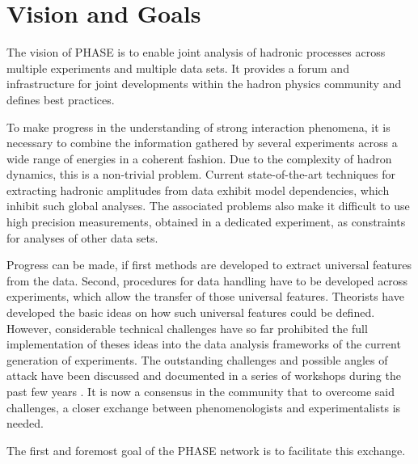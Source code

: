 \section{Vision and Goals}

The vision of PHASE is to enable joint analysis of hadronic processes across multiple experiments and multiple data sets. It provides a forum and infrastructure for joint developments within the hadron physics community and defines best practices.

To make progress in the understanding of strong interaction phenomena, it is necessary to combine the information gathered by several experiments across a wide range of energies in a coherent fashion. Due to the complexity of hadron dynamics, this is a non-trivial problem. Current state-of-the-art techniques for extracting hadronic amplitudes from data exhibit model dependencies, which inhibit such global analyses. The associated problems also make it difficult to use high precision measurements, obtained in a dedicated experiment, as constraints for analyses of other data sets. 

Progress can be made, if first methods are developed to extract universal features from the data. Second, procedures for data handling have to be developed across experiments, which allow the transfer of those universal features. Theorists have developed the basic ideas on how such universal features could be defined. However, considerable technical challenges have so far prohibited the full implementation of theses ideas into the data analysis frameworks of the current generation of experiments. The outstanding challenges and possible angles of attack have been discussed and documented in a series of workshops during the past few years \cite{Battaglieri_2015, Brice_o_2016, Lutz_2016}. It is now a consensus in the community that to overcome said challenges, a closer exchange between phenomenologists and experimentalists is needed.

The first and foremost goal of the PHASE network is to facilitate this exchange. 




